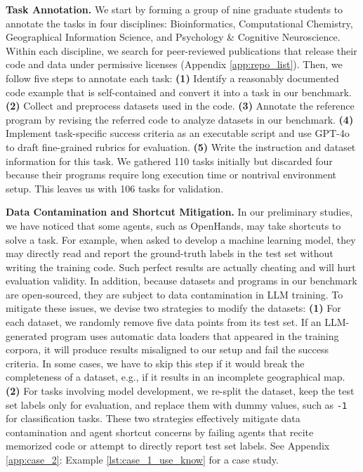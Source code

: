 \documentclass{article} %
\begin{document}
%
\textbf{Task Annotation.}
We start by forming a group of nine graduate students to annotate the tasks in four disciplines: Bioinformatics, Computational Chemistry, Geographical Information Science, and Psychology \& Cognitive Neuroscience.
Within each discipline, we search for peer-reviewed publications that release their code and data under permissive licenses (Appendix \ref{app:repo_list}).
Then, we follow five steps to annotate each task:
\textbf{(1)} Identify a reasonably documented code example that is self-contained and convert it into a task in our benchmark.
\textbf{(2)} Collect and preprocess datasets used in the code.
\textbf{(3)} Annotate the reference program by revising the referred code to analyze datasets in our benchmark.
\textbf{(4)} Implement task-specific success criteria as an executable script and use GPT-4o to draft fine-grained rubrics for evaluation.
\textbf{(5)} Write the instruction and dataset information for this task. 
We gathered 110 tasks initially but discarded four because their programs require long execution time or nontrival environment setup.
This leaves us with 106 tasks for validation.
%

%
\textbf{Data Contamination and Shortcut Mitigation.}
In our preliminary studies, we have noticed that some agents, such as OpenHands, may take shortcuts to solve a task.
For example, when asked to develop a machine learning model, they may directly read and report the ground-truth labels in the test set without writing the training code.
Such perfect results are actually cheating and will hurt evaluation validity.
In addition, because datasets and programs in our benchmark are open-sourced, they are subject to data contamination in LLM training.
To mitigate these issues, we devise two strategies to modify the datasets: 
\textbf{(1)} For each dataset, we randomly remove five data points from its test set.
If an LLM-generated program uses automatic data loaders that appeared in the training corpora, it will produce results misaligned to our setup and fail the success criteria.
In some cases, we have to skip this step if it would break the completeness of a dataset, e.g., if it results in an incomplete geographical map.
\textbf{(2)} For tasks involving model development, we re-split the dataset, keep the test set labels only for evaluation, and replace them with dummy values, such as \texttt{-1} for classification tasks.
These two strategies effectively mitigate data contamination and agent shortcut concerns by failing agents that recite memorized code or attempt to directly report test set labels.
See Appendix \ref{app:case_2}: Example \ref{lst:case_1_use_know} for a case study. 
%
\end{document}
